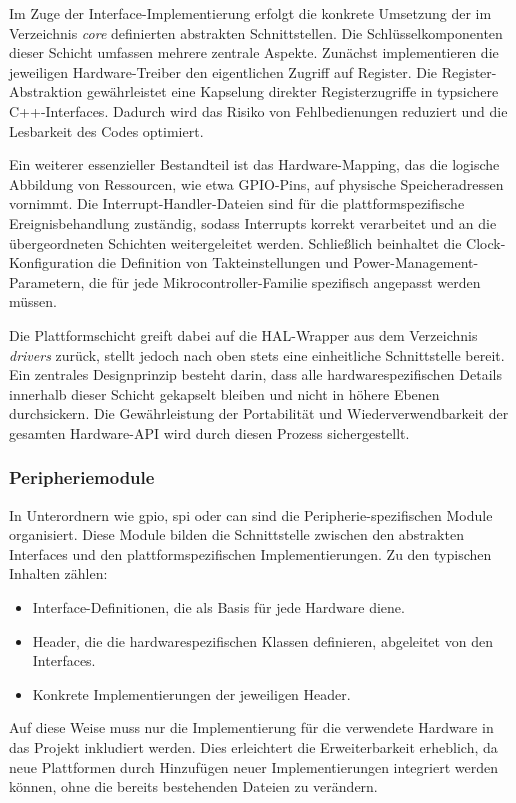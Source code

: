 Im Zuge der Interface-Implementierung erfolgt die konkrete Umsetzung der im Verzeichnis \textit{core} definierten abstrakten Schnittstellen. 
Die Schlüsselkomponenten dieser Schicht umfassen mehrere zentrale Aspekte. 
Zunächst implementieren die jeweiligen Hardware-Treiber den eigentlichen Zugriff auf Register.
Die Register-Abstraktion gewährleistet eine Kapselung direkter Registerzugriffe in typsichere C++-Interfaces. 
Dadurch wird das Risiko von Fehlbedienungen reduziert und die Lesbarkeit des Codes optimiert.

Ein weiterer essenzieller Bestandteil ist das Hardware-Mapping, das die logische Abbildung von Ressourcen, wie etwa GPIO-Pins, auf physische Speicheradressen vornimmt. 
Die Interrupt-Handler-Dateien sind für die plattformspezifische Ereignisbehandlung zuständig, sodass Interrupts korrekt verarbeitet und an die übergeordneten Schichten weitergeleitet werden. 
Schließlich beinhaltet die Clock-Konfiguration die Definition von Takteinstellungen und Power-Management-Parametern, die für jede Mikrocontroller-Familie spezifisch angepasst werden müssen.

Die Plattformschicht greift dabei auf die HAL-Wrapper aus dem Verzeichnis \textit{drivers} zurück, stellt jedoch nach oben stets eine einheitliche Schnittstelle bereit. 
Ein zentrales Designprinzip besteht darin, dass alle hardwarespezifischen Details innerhalb dieser Schicht gekapselt bleiben und nicht in höhere Ebenen durchsickern. 
Die Gewährleistung der Portabilität und Wiederverwendbarkeit der gesamten Hardware-API wird durch diesen Prozess sichergestellt.

\subsubsection*{Peripheriemodule}
In Unterordnern wie gpio, spi oder can sind die Peripherie-spezifischen Module organisiert. 
Diese Module bilden die Schnittstelle zwischen den abstrakten Interfaces und den plattformspezifischen Implementierungen.
Zu den typischen Inhalten zählen:
\begin{itemize}
	\item Interface-Definitionen, die als Basis für jede Hardware diene.
	\item Header, die die hardwarespezifischen Klassen definieren, abgeleitet von den Interfaces.
	\item Konkrete Implementierungen der jeweiligen Header.
\end{itemize}

Auf diese Weise muss nur die Implementierung für die verwendete Hardware in das Projekt inkludiert werden.
Dies erleichtert die Erweiterbarkeit erheblich, da neue Plattformen durch Hinzufügen neuer Implementierungen integriert werden können, ohne die bereits bestehenden Dateien zu verändern.


